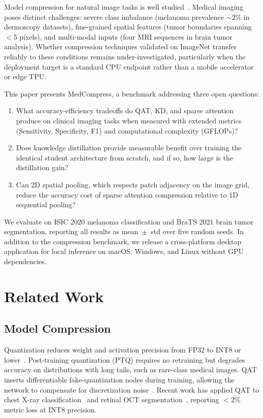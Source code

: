 \documentclass[10pt,twocolumn]{article}
\begin{document}
Model compression for natural image tasks is well studied~\citep{gholami2022survey, choudhary2020comprehensive}. Medical imaging poses distinct challenges: severe class imbalance (melanoma prevalence ${\sim}2\%$ in dermoscopy datasets), fine-grained spatial features (tumor boundaries spanning $<$5 pixels), and multi-modal inputs (four MRI sequences in brain tumor analysis). Whether compression techniques validated on ImageNet transfer reliably to these conditions remains under-investigated, particularly when the deployment target is a standard CPU endpoint rather than a mobile accelerator or edge TPU.

This paper presents MedCompress, a benchmark addressing three open questions:
\begin{enumerate}
    \item What accuracy-efficiency tradeoffs do QAT, KD, and sparse attention produce on clinical imaging tasks when measured with extended metrics (Sensitivity, Specificity, F1) and computational complexity (GFLOPs)?
    \item Does knowledge distillation provide measurable benefit over training the identical student architecture from scratch, and if so, how large is the distillation gain?
    \item Can 2D spatial pooling, which respects patch adjacency on the image grid, reduce the accuracy cost of sparse attention compression relative to 1D sequential pooling?
\end{enumerate}

We evaluate on ISIC 2020 melanoma classification and BraTS 2021 brain tumor segmentation, reporting all results as mean~$\pm$~std over five random seeds. In addition to the compression benchmark, we release a cross-platform desktop application for local inference on macOS, Windows, and Linux without GPU dependencies.

\section{Related Work}
\label{sec:related}

\subsection{Model Compression}

Quantization reduces weight and activation precision from FP32 to INT8 or lower~\citep{jacob2018quantization, gholami2022survey}. Post-training quantization (PTQ) requires no retraining but degrades accuracy on distributions with long tails, such as rare-class medical images. QAT inserts differentiable fake-quantization nodes during training, allowing the network to compensate for discretization noise~\citep{tfmot2023}. Recent work has applied QAT to chest X-ray classification~\citep{li2023quantization} and retinal OCT segmentation~\citep{chen2024efficient}, reporting $<$2\% metric loss at INT8 precision.
\end{document}
